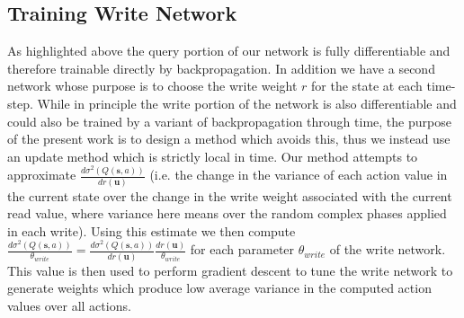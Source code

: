 \documentclass{article}
\begin{document}
\subsection*{Training Write Network}
As highlighted above the query portion of our network is fully differentiable and therefore trainable directly by backpropagation. In addition we have a second network whose purpose is to choose the write weight $r$ for the state at each time-step. While in principle the write portion of the network is also differentiable and could also be trained by a variant of backpropagation through time, the purpose of the present work is to design a method which avoids this, thus we instead use an update method which is strictly local in time. Our method attempts to approximate $\frac{d\sigma^2(Q(\pmb{s},a))}{dr(\pmb{u})}$ (i.e. the change in the variance of each action value in the current state over the change in the write weight associated with the current read value, where variance here means over the random complex phases applied in each write). Using this estimate we then compute $\frac{d\sigma^2(Q(\pmb{s},a))}{\theta_{write}}=\frac{d\sigma^2(Q(\pmb{s},a))}{dr(\pmb{u})}\frac{dr(\pmb{u})}{\theta_{write}}$ for each parameter $\theta_{write}$ of the write network. This value is then used to perform gradient descent to tune the write network to generate weights which produce low average variance in the computed action values over all actions.
\end{document}
